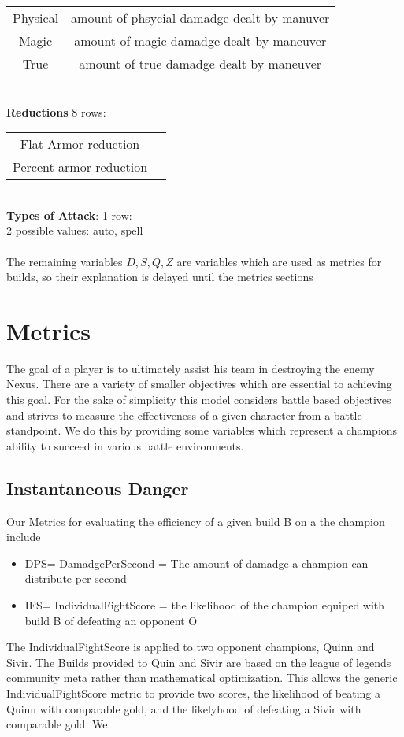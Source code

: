 \documentclass{article}
\begin{document}
\begin{tabular}{cc}
Physical & amount of phsycial damadge dealt by manuver\\
Magic & amount of magic damadge dealt by maneuver\\
True & amount of true damadge dealt by maneuver\\
\end{tabular}\\
{\bf Reductions} 8 rows:\\
\begin{tabular}{cc}
Flat Armor reduction \\
Percent armor reduction\\
\end{tabular} \\
{\bf Types of Attack}: 1 row:\\
 2 possible values: auto, spell   \\\\
The remaining variables $D,S,Q,Z$ are variables which are used as metrics for builds, so their explanation is delayed until the metrics sections

\newpage

\section{Metrics}
The goal of a player is to ultimately assist his team in destroying the enemy Nexus.  There are a variety of smaller objectives which are essential to achieving this goal.  For the sake of simplicity this model considers battle based objectives and strives to  measure the effectiveness of a given character from a battle standpoint.  We do this by providing some variables which represent a champions ability to succeed in various battle environments.
\subsection{Instantaneous Danger}
 Our Metrics for evaluating the efficiency of a given build B on a the champion  include\\
\begin{itemize}
	\item  DPS=  DamadgePerSecond = The amount of damadge a champion can distribute per second 
	\item  IFS= IndividualFightScore = the likelihood of the champion equiped with build B of defeating an opponent O
\end{itemize}
The IndividualFightScore is applied to two opponent champions, Quinn and Sivir.  The Builds provided to Quin and Sivir are based on the league of legends community meta rather than mathematical optimization.  This allows the generic IndividualFightScore metric to provide two scores, the likelihood of beating a Quinn with comparable gold, and the likelyhood of defeating a Sivir with comparable gold.  We
\end{document}
